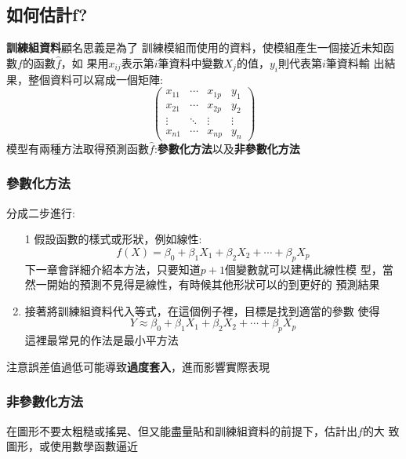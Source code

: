 \documentclass{report} %
\begin{document}
    \subsection{如何估計f?}
      {\bf 訓練組資料}顧名思義是為了
        訓練模組而使用的資料，使模組產生一個接近未知函數$f$的函數$\hat{f}$，如
        果用$x_{ij}$表示第$i$筆資料中變數$X_j$的值，$y_i$則代表第$i$筆資料輸
        出結果，整個資料可以寫成一個矩陣:
      \[
        \left(
          \begin{array}{cccc}
            x_{11} & \cdots & x_{1p} & y_1 \\
            x_{21} & \cdots & x_{2p} & y_2 \\
            \vdots & \ddots & \vdots & \vdots \\
            x_{n1} & \cdots & x_{np} & y_n
          \end{array}
        \right)
      \]
      模型有兩種方法取得預測函數$\hat{f}$:{\bf 參數化方法}以及{\bf 非參數化方法}
      \subsubsection{參數化方法}
        分成二步進行:
        \begin{enumerate}
          \item[1] 假設函數的樣式或形狀，例如線性:
            \begin{equation}				
              f(X) = \beta_0 + \beta_1X_1 + \beta_2X_2 + \cdots +
                \beta_pX_p
            \end{equation}
            下一章會詳細介紹本方法，只要知道$p + 1$個變數就可以建構此線性模
              型，當然一開始的預測不見得是線性，有時候其他形狀可以的到更好的
              預測結果
          \item 接著將訓練組資料代入等式，在這個例子裡，目標是找到適當的參數
            使得
            \begin{equation}				
              Y \approx \beta_0 + \beta_1X_1 + \beta_2X_2 + \cdots
                + \beta_pX_p
            \end{equation}
            這裡最常見的作法是最小平方法
        \end{enumerate}
        注意誤差值過低可能導致{\bf 過度套入}，進而影響實際表現 \\
      \subsubsection{非參數化方法}
        在圖形不要太粗糙或搖晃、但又能盡量貼和訓練組資料的前提下，估計出$f$的大
          致圖形，或使用數學函數逼近
\end{document}
